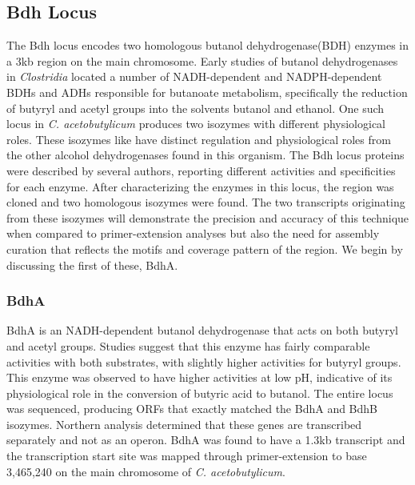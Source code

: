 \subsection{Bdh Locus}
The Bdh locus encodes two homologous butanol dehydrogenase(BDH) enzymes in a 3kb region on the main chromosome. Early studies of butanol dehydrogenases in \textit{Clostridia} located a number of NADH-dependent and NADPH-dependent BDHs and ADHs responsible for butanoate metabolism\cite{70,71,72,73}, specifically the reduction of butyryl and acetyl groups into the solvents butanol and ethanol. One such locus in \textit{C. acetobutylicum} produces two isozymes with different physiological roles. These isozymes like have distinct regulation and physiological roles from the other alcohol dehydrogenases found in this organism. The Bdh locus proteins were described by several authors, reporting different activities and specificities for each enzyme\cite{70,71}. After characterizing the enzymes in this locus, the region was cloned and two homologous isozymes were found. The two transcripts originating from these isozymes will demonstrate the precision and accuracy of this technique when compared to primer-extension analyses but also the need for assembly curation that reflects the motifs and coverage pattern of the region. We begin by discussing the first of these, BdhA.
\subsubsection{BdhA}
BdhA is an NADH-dependent butanol dehydrogenase that acts on both butyryl and acetyl groups. Studies suggest that this enzyme has fairly comparable activities with both substrates, with slightly higher activities for butyryl groups\cite{71}. This enzyme was observed to have higher activities at low pH, indicative of its physiological role in the conversion of butyric acid to butanol. The entire locus was sequenced, producing ORFs that exactly matched the BdhA and BdhB isozymes\cite{73}. Northern analysis determined that these genes are transcribed separately and not as an operon. BdhA was found to have a 1.3kb transcript and the transcription start site was mapped through primer-extension to base 3,465,240 on the main chromosome of \textit{C. acetobutylicum}\cite{73}. 

